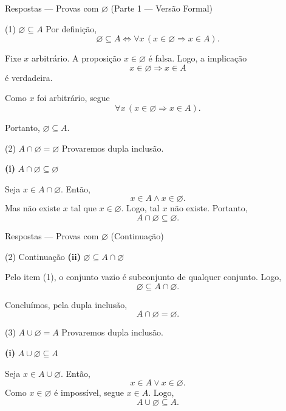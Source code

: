 \documentclass[9pt]{beamer}
\begin{document}
\begin{frame}{Respostas — Provas com $\varnothing$ (Parte 1 — Versão Formal)}

\begin{block}{(1) $\varnothing \subseteq A$}
Por definição,
\[
\varnothing \subseteq A 
\Longleftrightarrow 
\forall x\, (x \in \varnothing \Rightarrow x \in A).
\]

Fixe $x$ arbitrário.
A proposição $x \in \varnothing$ é falsa.
Logo, a implicação
\[
x \in \varnothing \Rightarrow x \in A
\]
é verdadeira.

Como $x$ foi arbitrário, segue
\[
\forall x\, (x \in \varnothing \Rightarrow x \in A).
\]

Portanto, $\varnothing \subseteq A$.
\end{block}

\begin{block}{(2) $A \cap \varnothing = \varnothing$}
Provaremos dupla inclusão.

\textbf{(i)} $A \cap \varnothing \subseteq \varnothing$

Seja $x \in A \cap \varnothing$.
Então,
\[
x \in A \land x \in \varnothing.
\]
Mas não existe $x$ tal que $x \in \varnothing$.
Logo, tal $x$ não existe.
Portanto,
\[
A \cap \varnothing \subseteq \varnothing.
\]
\end{block}

\end{frame}\begin{frame}{Respostas — Provas com $\varnothing$ (Continuação)}

\begin{block}{(2) Continuação}
\textbf{(ii)} $\varnothing \subseteq A \cap \varnothing$

Pelo item (1), o conjunto vazio é subconjunto de qualquer conjunto.
Logo,
\[
\varnothing \subseteq A \cap \varnothing.
\]

Concluímos, pela dupla inclusão,
\[
A \cap \varnothing = \varnothing.
\]
\end{block}

\begin{block}{(3) $A \cup \varnothing = A$}
Provaremos dupla inclusão.

\textbf{(i)} $A \cup \varnothing \subseteq A$

Seja $x \in A \cup \varnothing$.
Então,
\[
x \in A \lor x \in \varnothing.
\]
Como $x \in \varnothing$ é impossível, segue $x \in A$.
Logo,
\[
A \cup \varnothing \subseteq A.
\]
\end{block}

\end{frame}
\end{document}
